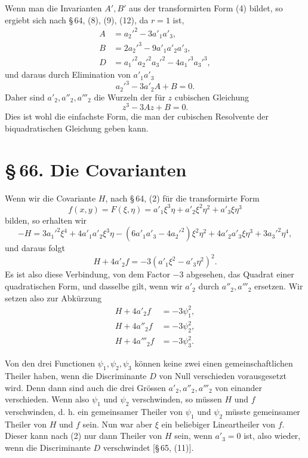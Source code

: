 \documentclass[11pt]{article}
\providecommand{\sect}[2]{\section*{\S\,#1. #2}}
\begin{document}
Wenn man die Invarianten $A',B'$ aus der transformirten Form (4) bildet, so ergiebt sich nach \S\,64, (8), (9), (12), da $r=1$ ist,
\begin{equation}
\begin{aligned}
 A&=a_2'^2-3a'_1a'_3,\\
 B&=2a_2'^3-9a'_1a'_2a'_3,\\
 D&=a_1'^2a_2'^2a_3'^2-4a_1'^3a_3'^3,
\end{aligned}
\tag{11}
\end{equation}
und daraus durch Elimination von $a'_1a'_3$
\[
 a_2'^3-3a'_2A+B=0.
\]
Daher sind $a'_2,a''_2,a'''_2$ die Wurzeln der für $z$ cubischen Gleichung
\begin{equation}
 z^3-3Az+B=0.
\tag{12}
\end{equation}
Dies ist wohl die einfachste Form, die man der cubischen Resolvente der biquadratischen Gleichung geben kann.

\sect{66}{Die Covarianten}

Wenn wir die Covariante $H$, nach \S\,64, (2) für die transformirte Form
\begin{equation}
 f(x,y)=F(\xi,\eta)=a'_1\xi^3\eta+a'_2\xi^2\eta^2+a'_3\xi\eta^3
\tag{1}
\end{equation}
bilden, so erhalten wir
\begin{equation}
 -H=3a_1'^2\xi^4+4a'_1a'_2\xi^3\eta-(6a'_1a'_3-4a_2'^2)\xi^2\eta^2+4a'_2a'_3\xi\eta^3+3a_3'^2\eta^4,
\tag{2}
\end{equation}
und daraus folgt
\begin{equation}
 H+4a'_2f=-3(a'_1\xi^2-a'_3\eta^2)^2.
\tag{3}
\end{equation}
Es ist also diese Verbindung, von dem Factor $-3$ abgesehen, das Quadrat einer quadratischen Form, und dasselbe gilt, wenn wir $a'_2$ durch $a''_2,a'''_2$ ersetzen. Wir setzen also zur Abkürzung
\begin{equation}
\begin{aligned}
 H+4a'_2f&=-3\psi_1^2,\\
 H+4a''_2f&=-3\psi_2^2,\\
 H+4a'''_2f&=-3\psi_3^2.
\end{aligned}
\tag{4}
\end{equation}

Von den drei Functionen $\psi_1,\psi_2,\psi_3$ können keine zwei einen gemeinschaftlichen Theiler haben, wenn die Discriminante $D$ von Null verschieden vorausgesetzt wird. Denn dann sind auch die drei Grössen $a'_2,a''_2,a'''_2$ von einander verschieden. Wenn also $\psi_1$ und $\psi_2$ verschwinden, so müssen $H$ und $f$ verschwinden, d. h. ein gemeinsamer Theiler von $\psi_1$ und $\psi_2$ müsste gemeinsamer Theiler von $H$ und $f$ sein. Nun war aber $\xi$ ein beliebiger Lineartheiler von $f$. Dieser kann nach (2) nur dann Theiler von $H$ sein, wenn $a'_3=0$ ist, also wieder, wenn die Discriminante $D$ verschwindet [\S\,65, (11)].
\end{document}
